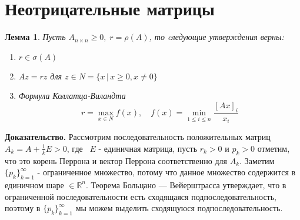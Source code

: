 \documentclass[a4paper,12pt,leqno]{article} %
\newtheorem{lemma}[theorem]{Лемма}
\begin{document}
    \section*{Неотрицательные матрицы}

    \begin{lemma}
        Пусть $A_{n \times n} \geq 0, \; r = \rho(A)$, то cледующие утверждения верны:
        \begin{enumerate}
            \item $r \in \sigma(A)$
            \item $Az = rz$ для $z \in N = \{x \, | \, x \geq 0, x \neq 0\}$
            \item Формула Коллатца-Виландта
            \begin{equation*}
                r = \max_{x \in N} f(x), \quad  f(x) = \min_{1 \leq i \leq n}\frac{[Ax]_{i}}{x_i}
            \end{equation*}
        \end{enumerate}
    \end{lemma}
    \textbf{Доказательство.} Рассмотрим последовательность положительных матриц 
    $A_k = A + \frac{1}{k}E > 0$, где  $E$ - единичная матрица, пусть $r_k > 0$ и $p_k > 0$
    отметим, что это корень Перрона и вектор Перрона соответственно для $A_k$.
    Заметим $\{p_k\}^{\infty}_{k = 1}$ - ограниченное множество, потому что 
    данное множество содержится в единичном шаре $\in \mathbb{R}^n$.
    Теорема Больцано — Вейерштрасса утверждает, что
    в ограниченной последовательности есть сходящаяся подпоследовательность, 
    поэтому в $\{p_k\}^{\infty}_{k = 1}$ мы 
    можем выделить сходящуюся подпоследовательность.
     
\end{document}
